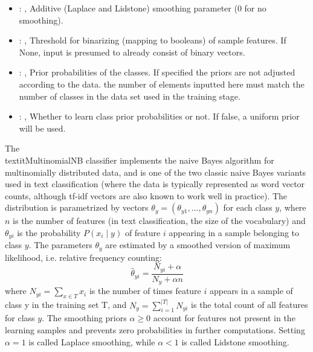 \begin{itemize}
    \item {}: , 
      Additive (Laplace and Lidstone) smoothing parameter (0 for no smoothing).

    \item {}: , 
      Threshold for binarizing (mapping to booleans) of sample features. If None,
      input is presumed to already consist of binary vectors.

    \item {}: , 
      Prior probabilities of the classes. If specified the priors are
      not adjusted according to the data. \nb the number of elements inputted here must
      match the number of classes in the data set used in the training stage.

    \item {}: , 
      Whether to learn class prior probabilities or not. If false, a uniform
      prior will be used.
  \end{itemize}
 The \\textit{MultinomialNB} classifier implements the naive Bayes algorithm for
 multinomially distributed data, and is one of the two classic naive Bayes
 variants used in text classification (where the data is typically represented
 as word vector counts, although tf-idf vectors are also known to work well in
 practice).                         The distribution is parametrized by vectors $\theta_y =
 (\theta_{y1},\ldots,\theta_{yn})$ for each class $y$, where $n$ is the number of
 features (in text classification, the size of the vocabulary) and $\theta_{yi}$
 is the probability $P(x_i \mid y)$ of feature $i$ appearing in a sample
 belonging to class $y$.                         The parameters $\theta_y$ are estimated by a
 smoothed version of maximum                         likelihood, i.e. relative frequency counting:
 \begin{equation}                         \hat{\theta}_{yi} = \frac{ N_{yi} + \alpha}{N_y + \alpha
 n}                         \end{equation}                         where $N_{yi} = \sum_{x \in T}
 x_i$ is the number of times feature $i$ appears                         in a sample of class y in
 the training set T, and                         $N_{y} = \sum_{i=1}^{|T|} N_{yi}$ is the total
 count of all features for class                         $y$.                         The smoothing
 priors $\alpha \ge 0$ account for features not present in the                         learning
 samples and prevents zero probabilities in further computations.                         Setting
 $\alpha = 1$ is called Laplace smoothing, while $\alpha < 1$ is called
 Lidstone smoothing.                         

